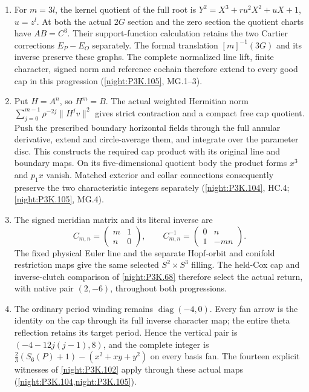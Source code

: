 \begin{enumerate}[label=\arabic*.]
  $(-4,8)$ before the explicitly tracked dual-line and boundary
  orientation arrows, which give the same physical pair
  (\cref{night:P3K.105}, MB.1--7 and its odd-ideal companion).
\item For $m=3l$, the kernel quotient of the full root is
  $Y^2=X^3+ru^2X^2+uX+1$, $u=z^l$.
  At both the actual $2G$ section and the zero section the quotient
  charts have $AB=C^3$. Their support-function calculation retains
  the two Cartier corrections $E_P-E_O$ separately.
  The formal translation $[m]^{-1}(3G)$ and its inverse preserve
  these graphs. The complete normalized line lift, finite
  character, signed norm and reference cochain therefore extend
  to every good cap in this progression
  (\cref{night:P3K.105}, MG.1--3).
\item Put $H=A^n$, so $H^m=B$. The actual weighted Hermitian
  norm $\sum_{j=0}^{m-1}\rho^{-2j}\|H^jv\|^2$ gives strict
  contraction and a compact free cap quotient. Push the prescribed
  boundary horizontal fields through the full annular derivative,
  extend and circle-average them, and integrate over the parameter
  disc. This constructs the required cap product with its original
  line and boundary maps. On its five-dimensional quotient body
  the product forms $x^3$ and $p_1x$ vanish. Matched exterior and
  collar connections consequently preserve the two characteristic
  integers separately
  (\cref{night:P3K.104}, HC.4; \cref{night:P3K.105}, MG.4).
\item The signed meridian matrix and its literal inverse are
  \[
  C_{m,n}=\begin{pmatrix}m&1\\n&0\end{pmatrix},\qquad
  C_{m,n}^{-1}=\begin{pmatrix}0&n\\1&-mn\end{pmatrix}.
  \]
  The fixed physical Euler line and the separate Hopf-orbit and
  conifold restriction maps give the same selected
  $S^2\times S^3$ filling. The held-Cox cap and inverse-clutch
  comparison of \cref{night:P3K.68} therefore select the actual
  return, with native pair $(2,-6)$, throughout both progressions.
\item The ordinary period winding remains
  $\operatorname{diag}(-4,0)$. Every fan arrow is the identity on
  the cap through its full inverse character map; the entire theta
  reflection retains its target period. Hence the vertical pair is
  $(-4-12j(j-1),8)$, and the complete integer is
  $\tfrac23(S_6(P)+1)-(x^2+xy+y^2)$ on every basis fan.
  The fourteen explicit witnesses of \cref{night:P3K.102}
  apply through these actual maps
  (\cref{night:P3K.104,night:P3K.105}).
\end{enumerate}

